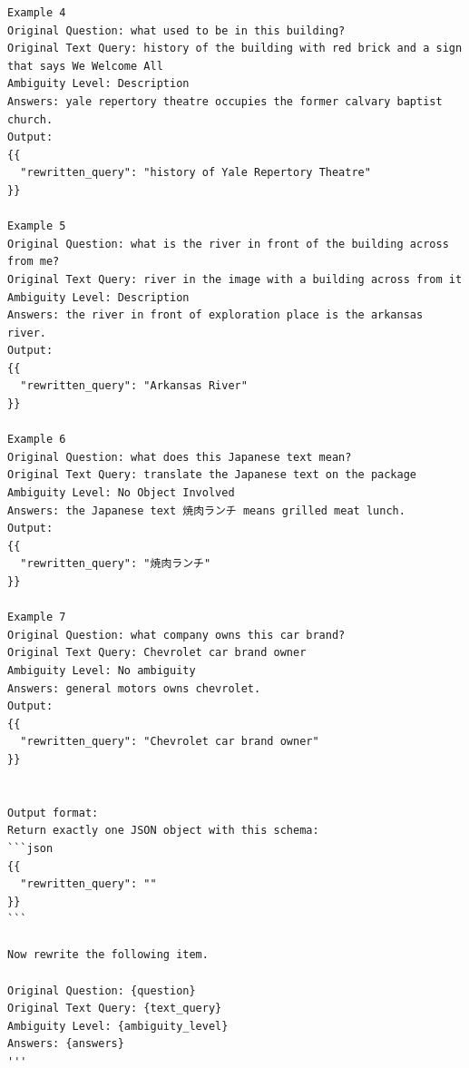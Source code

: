 \begin{verbatim}
Example 4
Original Question: what used to be in this building?
Original Text Query: history of the building with red brick and a sign that says We Welcome All
Ambiguity Level: Description
Answers: yale repertory theatre occupies the former calvary baptist church.
Output:
{{
  "rewritten_query": "history of Yale Repertory Theatre"
}}

Example 5
Original Question: what is the river in front of the building across from me?
Original Text Query: river in the image with a building across from it
Ambiguity Level: Description
Answers: the river in front of exploration place is the arkansas river.
Output:
{{
  "rewritten_query": "Arkansas River"
}}

Example 6
Original Question: what does this Japanese text mean?
Original Text Query: translate the Japanese text on the package
Ambiguity Level: No Object Involved
Answers: the Japanese text 焼肉ランチ means grilled meat lunch.
Output:
{{
  "rewritten_query": "焼肉ランチ"
}}

Example 7
Original Question: what company owns this car brand?
Original Text Query: Chevrolet car brand owner
Ambiguity Level: No ambiguity
Answers: general motors owns chevrolet.
Output:
{{
  "rewritten_query": "Chevrolet car brand owner"
}}


Output format:
Return exactly one JSON object with this schema:
```json
{{
  "rewritten_query": ""
}}
```

Now rewrite the following item.

Original Question: {question}
Original Text Query: {text_query}
Ambiguity Level: {ambiguity_level}
Answers: {answers}
'''
\end{verbatim}

